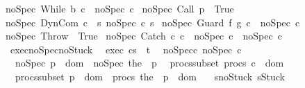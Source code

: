 \begin{isabellebody}
{\isachardoublequoteopen}noSpec\ {\isacharparenleft}While\ b\ c{\isacharparenright}\ {\isacharequal}\ noSpec\ c{\isachardoublequoteclose}\ {\isacharbar}\isanewline
{\isachardoublequoteopen}noSpec\ {\isacharparenleft}Call\ p{\isacharparenright}\ {\isacharequal}\ True{\isachardoublequoteclose}\ {\isacharbar}\isanewline
{\isachardoublequoteopen}noSpec\ {\isacharparenleft}DynCom\ c{\isacharparenright}\ {\isacharequal}\ {\isacharparenleft}{\isasymforall}s{\isachardot}\ noSpec\ {\isacharparenleft}c\ s{\isacharparenright}{\isacharparenright}{\isachardoublequoteclose}\ {\isacharbar}\isanewline
{\isachardoublequoteopen}noSpec\ {\isacharparenleft}Guard\ f\ g\ c{\isacharparenright}\ {\isacharequal}\ noSpec\ c{\isachardoublequoteclose}\ {\isacharbar}\isanewline
{\isachardoublequoteopen}noSpec\ Throw\ {\isacharequal}\ True{\isachardoublequoteclose}\ {\isacharbar}\isanewline
{\isachardoublequoteopen}noSpec\ {\isacharparenleft}Catch\ c\ c\ {\isacharequal}\ {\isacharparenleft}noSpec\ c\ {\isasymand}\ noSpec\ c\isanewline
\isanewline
{}\isamarkupfalse%
\ exec{\isacharunderscore}noSpec{\isacharunderscore}no{\isacharunderscore}Stuck{\isacharcolon}\isanewline
\ \ exec{\isacharcolon}\ {\isachardoublequoteopen}{\isasymGamma}{\isasymturnstile}{\isasymlangle}c{\isacharcomma}s{\isasymrangle}\ {\isasymRightarrow}\ t{\isachardoublequoteclose}\isanewline
\ \ noSpec{\isacharunderscore}c{\isacharcolon}\ {\isachardoublequoteopen}noSpec\ c{\isachardoublequoteclose}\isanewline
\ \ noSpec{\isacharunderscore}{\isasymGamma}{\isacharcolon}\ {\isachardoublequoteopen}{\isasymforall}p\ {\isasymin}\ dom\ {\isasymGamma}{\isachardot}\ noSpec\ {\isacharparenleft}the\ {\isacharparenleft}{\isasymGamma}\ p{\isacharparenright}{\isacharparenright}{\isachardoublequoteclose}\isanewline
\ \ procs{\isacharunderscore}subset{\isacharcolon}\ {\isachardoublequoteopen}procs\ c\ {\isasymsubseteq}\ dom\ {\isasymGamma}{\isachardoublequoteclose}\isanewline
\ \ procs{\isacharunderscore}subset{\isacharunderscore}{\isasymGamma}{\isacharcolon}\ {\isachardoublequoteopen}{\isasymforall}p\ {\isasymin}\ dom\ {\isasymGamma}{\isachardot}\ procs\ {\isacharparenleft}the\ {\isacharparenleft}{\isasymGamma}\ p{\isacharparenright}{\isacharparenright}\ {\isasymsubseteq}\ dom\ {\isasymGamma}{\isachardoublequoteclose}\isanewline
\ \ s{\isacharunderscore}no{\isacharunderscore}Stuck{\isacharcolon}\ {\isachardoublequoteopen}s{\isasymnoteq}Stuck{\isachardoublequoteclose}\isanewline

\end{isabellebody}
